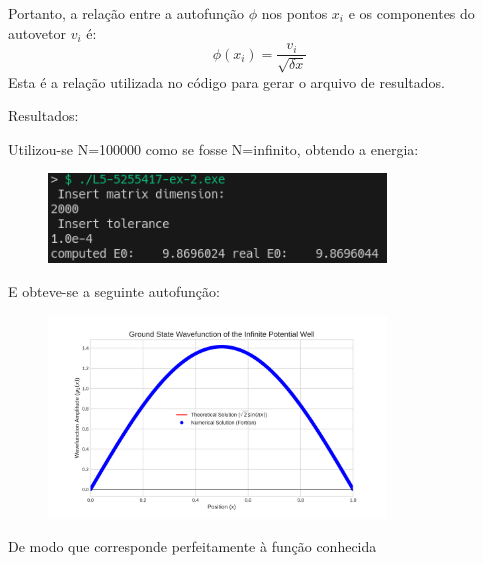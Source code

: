 \documentclass[12pt, a4paper]{article} %
\begin{document}
                Portanto, a relação entre a autofunção $\phi$ nos pontos $x_i$ e os componentes do autovetor $v_i$ é:
                \begin{equation}
                    \phi(x_i) = \frac{v_i}{\sqrt{\delta x}}
                \end{equation}
                Esta é a relação utilizada no código para gerar o arquivo de resultados.

        Resultados:

        Utilizou-se N=100000 como se fosse N=infinito, obtendo a energia:
        \begin{figure}[H]
            \centering
            \includegraphics[width=0.8\textwidth]{../images/ex2.png}
        \end{figure}
        E obteve-se a seguinte autofun\c{c}\~ao:
        \begin{figure}[H]
            \centering
            \includegraphics[width=0.8\textwidth]{../images/wavefunction_plot.png}
        \end{figure}

    De modo que corresponde perfeitamente à fun\c{c}\~ao conhecida
        
\end{document}
